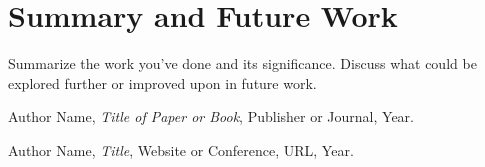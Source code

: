 \documentclass[12pt]{article}
\begin{document}
\section{Summary and Future Work}
Summarize the work you've done and its significance. Discuss what could be explored further or improved upon in future work.

\newpage
\begin{thebibliography}{9}
    Author Name, \textit{Title of Paper or Book}, Publisher or Journal, Year.

    Author Name, \textit{Title}, Website or Conference, URL, Year.
\end{thebibliography}
\end{document}
